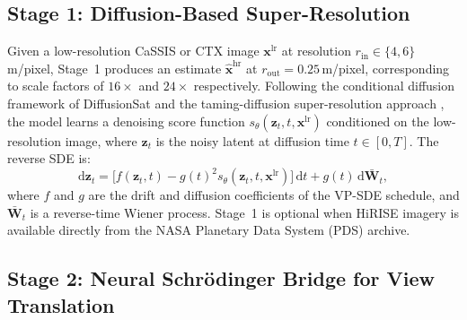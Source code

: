 \documentclass[10pt,journal]{IEEEtran}
\begin{document}
\subsection{Stage 1: Diffusion-Based Super-Resolution}
Given a low-resolution CaSSIS or CTX image $\mathbf{x}^{\mathrm{lr}}$ at
resolution $r_{\mathrm{in}} \in \{4, 6\}$\,m/pixel, Stage~1 produces an
estimate $\hat{\mathbf{x}}^{\mathrm{hr}}$ at $r_{\mathrm{out}} = 0.25$\,m/pixel,
corresponding to scale factors of $16\times$ and $24\times$ respectively.
Following the conditional diffusion framework of DiffusionSat
\cite{khanna2024diffusionsat} and the taming-diffusion super-resolution
approach \cite{zhu2025taming}, the model learns a denoising score function
$s_\theta(\mathbf{z}_t, t, \mathbf{x}^{\mathrm{lr}})$ conditioned on the
low-resolution image, where $\mathbf{z}_t$ is the noisy latent at diffusion
time $t \in [0, T]$. The reverse SDE is:
\begin{equation}
  \mathrm{d}\mathbf{z}_t = \bigl[f(\mathbf{z}_t, t)
    - g(t)^2 s_\theta(\mathbf{z}_t, t, \mathbf{x}^{\mathrm{lr}})\bigr]\,\mathrm{d}t
    + g(t)\,\mathrm{d}\bar{\mathbf{W}}_t,
  \label{eq:sr_sde}
\end{equation}
where $f$ and $g$ are the drift and diffusion coefficients of the VP-SDE
schedule, and $\bar{\mathbf{W}}_t$ is a reverse-time Wiener process.
Stage~1 is optional when HiRISE imagery is available directly from the NASA
Planetary Data System (PDS) archive.

\subsection{Stage 2: Neural Schr\"{o}dinger Bridge for View Translation}
\label{sec:nsb_formulation}
\end{document}
